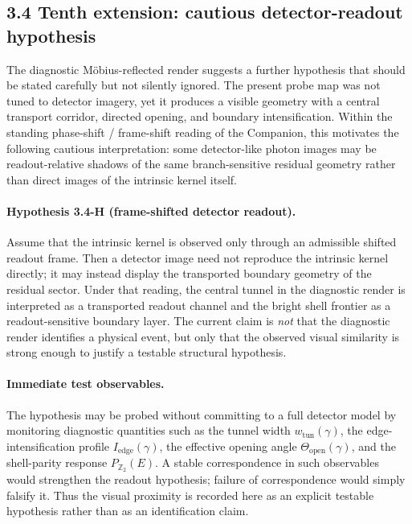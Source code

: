 \documentclass[12pt,a4paper]{article}
\begin{document}
\subsection*{3.4 Tenth extension: cautious detector-readout hypothesis}
The diagnostic M\"obius-reflected render suggests a further hypothesis that should be stated carefully but not silently ignored. The present probe map was not tuned to detector imagery, yet it produces a visible geometry with a central transport corridor, directed opening, and boundary intensification. Within the standing phase-shift / frame-shift reading of the Companion, this motivates the following cautious interpretation: some detector-like photon images may be readout-relative shadows of the same branch-sensitive residual geometry rather than direct images of the intrinsic kernel itself.

\paragraph{Hypothesis 3.4-H (frame-shifted detector readout).}
Assume that the intrinsic kernel is observed only through an admissible shifted readout frame. Then a detector image need not reproduce the intrinsic kernel directly; it may instead display the transported boundary geometry of the residual sector. Under that reading, the central tunnel in the diagnostic render is interpreted as a transported readout channel and the bright shell frontier as a readout-sensitive boundary layer. The current claim is \emph{not} that the diagnostic render identifies a physical event, but only that the observed visual similarity is strong enough to justify a testable structural hypothesis.

\paragraph{Immediate test observables.}
The hypothesis may be probed without committing to a full detector model by monitoring diagnostic quantities such as the tunnel width $w_{\mathrm{tun}}(\gamma)$, the edge-intensification profile $I_{\mathrm{edge}}(\gamma)$, the effective opening angle $\Theta_{\mathrm{open}}(\gamma)$, and the shell-parity response $P_{\mathbb Z_2}(E)$. A stable correspondence in such observables would strengthen the readout hypothesis; failure of correspondence would simply falsify it. Thus the visual proximity is recorded here as an explicit testable hypothesis rather than as an identification claim.
\end{document}
